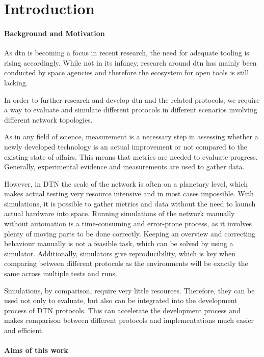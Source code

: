 \chapter{Introduction}

\subsubsection{Background and Motivation}

As \acl{dtn} is becoming a focus in recent research, the need for adequate tooling is rising accordingly. While not in its infancy, research around \ac{dtn} has mainly been conducted by space agencies and therefore the ecosystem for open tools is still lacking.

In order to further research and develop \ac{dtn} and the related protocols, we require a way to evaluate and simulate different protocols in different scenarios involving different network topologies.

As in any field of science, measurement is a necessary step in assessing whether a newly developed technology is an actual improvement or not compared to the existing state of affairs. This means that metrics are needed to evaluate progress. Generally, experimental evidence and measurements are used to gather data.

However, in DTN the scale of the network is often on a planetary level, which makes actual testing very resource intensive and in most cases impossible. With simulations, it is possible to gather metrics and data without the need to launch actual hardware into space. Running simulations of the network manually without automation is a time-consuming and error-prone process, as it involves plenty of moving parts to be done correctly. Keeping an overview and correcting behaviour manually is not a feasible task, which can be solved by using a simulator. Additionally, simulators give reproducibility, which is key when comparing between different protocols as the environments will be exactly the same across multiple tests and runs.

Simulations, by comparison, require very little resources. Therefore, they can be used not only to evaluate, but also can be integrated into the development process of DTN protocols. This can accelerate the development process and makes comparison between different protocols and implementations much easier and efficient.

\subsubsection{Aims of this work}

